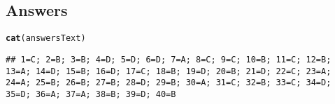 \documentclass[12pt, a4paper]{exam}\usepackage[]{graphicx}\usepackage[]{color}
\makeatletter
\newcommand{\hlstd}[1]{\textcolor[rgb]{0.345,0.345,0.345}{#1}}%
\newcommand{\hlkwd}[1]{\textcolor[rgb]{0.737,0.353,0.396}{\textbf{#1}}}%
\newenvironment{kframe}{%
 \def\at@end@of@kframe{}%
 \ifinner\ifhmode%
  \def\at@end@of@kframe{\end{minipage}}%
  \begin{minipage}{\columnwidth}%
 \fi\fi%
 \def\FrameCommand##1{\hskip\@totalleftmargin \hskip-\fboxsep
 \colorbox{shadecolor}{##1}\hskip-\fboxsep
     \hskip-\linewidth \hskip-\@totalleftmargin \hskip\columnwidth}%
 \MakeFramed {\advance\hsize-\width
   \@totalleftmargin\z@ \linewidth\hsize
   \@setminipage}}%
 {\par\unskip\endMakeFramed%
 \at@end@of@kframe}
\newenvironment{knitrout}{}{} %
\makeatother
\begin{document}
\begin{questions}
\section*{Answers}
\begin{knitrout}
\color{fgcolor}\begin{kframe}
\begin{alltt}
\hlkwd{cat}\hlstd{(answersText)}
\end{alltt}
\begin{verbatim}
## 1=C; 2=B; 3=B; 4=D; 5=D; 6=D; 7=A; 8=C; 9=C; 10=B; 11=C; 12=B; 13=A; 14=D; 15=B; 16=D; 17=C; 18=B; 19=D; 20=B; 21=D; 22=C; 23=A; 24=A; 25=B; 26=B; 27=B; 28=D; 29=B; 30=A; 31=C; 32=B; 33=C; 34=D; 35=D; 36=A; 37=A; 38=B; 39=D; 40=B
\end{verbatim}
\end{kframe}
\end{knitrout}

\end{questions}
\end{document}
